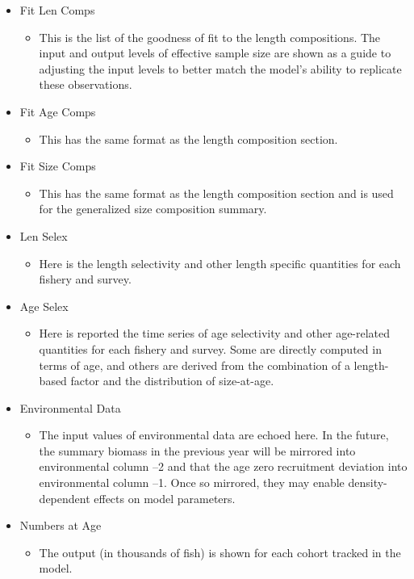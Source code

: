 \begin{itemize}
	\item Fit Len Comps
	\begin{itemize}
		\item This is the list of the goodness of fit to the length compositions.  The input and output levels of effective sample size are shown as a guide to adjusting the input levels to better match the model’s ability to replicate these observations.
	\end{itemize}
	\item Fit Age Comps
	\begin{itemize}
		\item This has the same format as the length composition section.
	\end{itemize}
	\item Fit Size Comps
	\begin{itemize}
		\item This has the same format as the length composition section and is used for the generalized size composition summary.
	\end{itemize}
	\item Len Selex
	\begin{itemize}
		\item Here is the length selectivity and other length specific quantities for each fishery and survey.
	\end{itemize}
	\item Age Selex
	\begin{itemize}
		\item Here is reported the time series of age selectivity and other age-related quantities for each fishery and survey.  Some are directly computed in terms of age, and others are derived from the combination of a length-based factor and the distribution of size-at-age.
	\end{itemize}
	\item Environmental Data
	\begin{itemize}
		\item The input values of environmental data are echoed here.  In the future, the summary biomass in the previous year will be mirrored into environmental column –2 and that the age zero recruitment deviation into environmental column –1.  Once so mirrored, they may enable density-dependent effects on model parameters.
	\end{itemize}
	\item Numbers at Age
	\begin{itemize}
		\item The output (in thousands of fish) is shown for each cohort tracked in the model.

\end{itemize}
\end{itemize}
